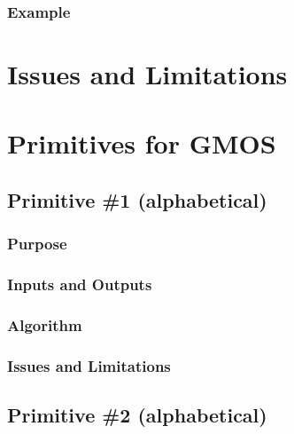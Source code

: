 \documentclass[letterpaper,10pt,english]{sphinxmanual}
\begin{document}
\subsubsection{Example}
\label{NIRI/tipstricks:id1}

\section{Issues and Limitations}
\label{NIRI/issueslimitations:gmos-issues-limitations}\label{NIRI/issueslimitations::doc}\label{NIRI/issueslimitations:issues-and-limitations}

\section{Primitives for GMOS}
\label{NIRI/primitives:primitives-for-gmos}\label{NIRI/primitives:gmos-primitives}\label{NIRI/primitives::doc}

\subsection{Primitive \#1  (alphabetical)}
\label{NIRI/primitives_pages/primitive1:gmos-primitive-1}\label{NIRI/primitives_pages/primitive1:primitive-1-alphabetical}\label{NIRI/primitives_pages/primitive1::doc}

\subsubsection{Purpose}
\label{NIRI/primitives_pages/primitive1:purpose}

\subsubsection{Inputs and Outputs}
\label{NIRI/primitives_pages/primitive1:inputs-and-outputs}

\subsubsection{Algorithm}
\label{NIRI/primitives_pages/primitive1:algorithm}

\subsubsection{Issues and Limitations}
\label{NIRI/primitives_pages/primitive1:issues-and-limitations}

\subsection{Primitive \#2  (alphabetical)}
\label{NIRI/primitives_pages/primitive2:primitive-2-alphabetical}\label{NIRI/primitives_pages/primitive2:gmos-primitive-2}\label{NIRI/primitives_pages/primitive2::doc}
\end{document}
